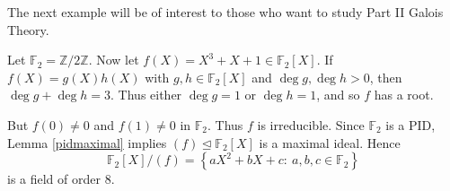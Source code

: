 \documentclass[egregdoesnotlikesansseriftitles,a4paper]{scrartcl}
\begin{document}
The next example will be of interest to those who want to study Part II Galois Theory.
\begin{example*}
       Let $\mathbb{F}_2 =\mathbb{Z}/2\mathbb{Z}$. Now let $f (X)=X^3 +X+1 \in \mathbb{F}_{2}[X]$. If $f (X)=g (X)h (X)$ with $g, h \in \mathbb{F}_{2}[X]$ and $\operatorname{deg}g , \operatorname{deg}h >0$, then $\operatorname{deg}g+ \operatorname{deg}h=3$. Thus either $\operatorname{deg}g =1$ or $\operatorname{deg}h=1$, and so $f$ has a root. 

       But $f (0 )\neq 0$ and $f (1)\neq 0$ in $\mathbb{F}_{2}$. Thus $f$ is irreducible. Since $\mathbb{F}_{2}$ is a PID, Lemma \ref{pidmaximal} implies $(f) \unlhd \mathbb{F}_{2}[X]$ is a maximal ideal. Hence \[
            \mathbb{F}_{2}[X]/(f)=\left\{aX^2+bX+c: \ a,b,c \in \mathbb{F}_{2}\right\}
       \] is a field of order 8.
\end{example*}
\end{document}
